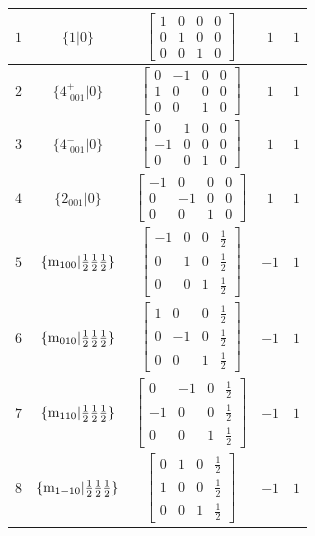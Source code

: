\documentclass[fleqn,8pt]{jsarticle}
\begin{document}
\begin{longtable}{ccccc}
$ 1 $ & $ \{1|0\} $ & $ \begin{bmatrix} 1 & 0 & 0 & 0 \\ 0 & 1 & 0 & 0 \\ 0 & 0 & 1 & 0 \end{bmatrix} $ & $ 1 $ & $ 1 $ \\ \hline
$ 2 $ & $ \{4^{+}_{\,\,001}|0\} $ & $ \begin{bmatrix} 0 & -1 & 0 & 0 \\ 1 & 0 & 0 & 0 \\ 0 & 0 & 1 & 0 \end{bmatrix} $ & $ 1 $ & $ 1 $ \\ \hline
$ 3 $ & $ \{4^{-}_{\,\,001}|0\} $ & $ \begin{bmatrix} 0 & 1 & 0 & 0 \\ -1 & 0 & 0 & 0 \\ 0 & 0 & 1 & 0 \end{bmatrix} $ & $ 1 $ & $ 1 $ \\ \hline
$ 4 $ & $ \{2{}_{001}|0\} $ & $ \begin{bmatrix} -1 & 0 & 0 & 0 \\ 0 & -1 & 0 & 0 \\ 0 & 0 & 1 & 0 \end{bmatrix} $ & $ 1 $ & $ 1 $ \\ \hline
$ 5 $ & $ \{{\rm m}_{100}|\frac{1}{2} \frac{1}{2} \frac{1}{2}\} $ & $ \begin{bmatrix} -1 & 0 & 0 & \frac{1}{2} \\ 0 & 1 & 0 & \frac{1}{2} \\ 0 & 0 & 1 & \frac{1}{2} \end{bmatrix} $ & $ -1 $ & $ 1 $ \\ \hline
$ 6 $ & $ \{{\rm m}_{010}|\frac{1}{2} \frac{1}{2} \frac{1}{2}\} $ & $ \begin{bmatrix} 1 & 0 & 0 & \frac{1}{2} \\ 0 & -1 & 0 & \frac{1}{2} \\ 0 & 0 & 1 & \frac{1}{2} \end{bmatrix} $ & $ -1 $ & $ 1 $ \\ \hline
$ 7 $ & $ \{{\rm m}_{110}|\frac{1}{2} \frac{1}{2} \frac{1}{2}\} $ & $ \begin{bmatrix} 0 & -1 & 0 & \frac{1}{2} \\ -1 & 0 & 0 & \frac{1}{2} \\ 0 & 0 & 1 & \frac{1}{2} \end{bmatrix} $ & $ -1 $ & $ 1 $ \\ \hline
$ 8 $ & $ \{{\rm m}_{1-10}|\frac{1}{2} \frac{1}{2} \frac{1}{2}\} $ & $ \begin{bmatrix} 0 & 1 & 0 & \frac{1}{2} \\ 1 & 0 & 0 & \frac{1}{2} \\ 0 & 0 & 1 & \frac{1}{2} \end{bmatrix} $ & $ -1 $ & $ 1 $ \\ \hline

\end{longtable}
\end{document}
